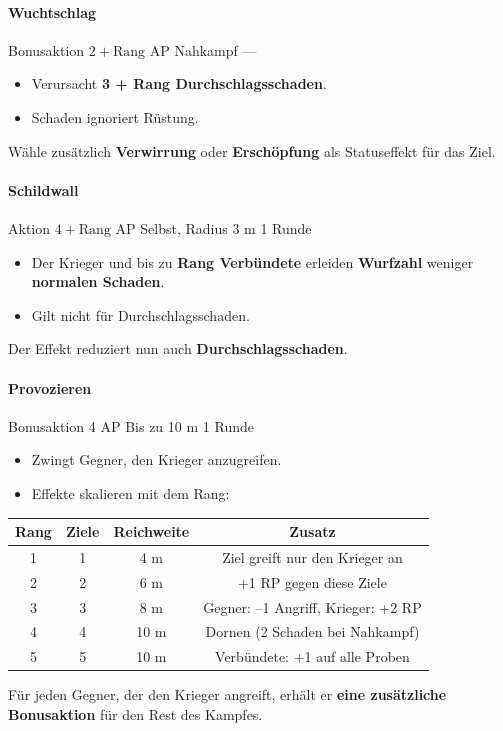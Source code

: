 \paragraph*{Wuchtschlag}

\skillcard
{}
{Bonusaktion}
{$2 + \text{Rang}$ AP}
{Nahkampf}
{—}
{
	\begin{itemize}
		\item Verursacht \textbf{3 + Rang Durchschlagsschaden}.
		\item Schaden ignoriert Rüstung.
	\end{itemize}
}
{
	Wähle zusätzlich \textbf{Verwirrung} oder \textbf{Erschöpfung} als Statuseffekt für das Ziel.
}

\paragraph*{Schildwall}
\skillcard
{}
{Aktion}
{$4 + \text{Rang}$ AP}
{Selbst, Radius 3 m}
{1 Runde}
{
	\begin{itemize}
		\item Der Krieger und bis zu \textbf{Rang Verbündete} erleiden
		\textbf{Wurfzahl} weniger \textbf{normalen Schaden}.
		\item Gilt nicht für Durchschlagsschaden.
	\end{itemize}
}
{
	Der Effekt reduziert nun auch \textbf{Durchschlagsschaden}.
}

\paragraph*{Provozieren}
\skillcard
{}
{Bonusaktion}
{4 AP}
{Bis zu 10 m}
{1 Runde}
{
	\begin{itemize}
		\item Zwingt Gegner, den Krieger anzugreifen.
		\item Effekte skalieren mit dem Rang:
	\end{itemize}
	
	\begin{center}
		\begin{tabular}{cccc}
			\toprule
			\textbf{Rang} & \textbf{Ziele} & \textbf{Reichweite} & \textbf{Zusatz} \\
			\midrule
			1 & 1 & 4 m & Ziel greift nur den Krieger an \\
			2 & 2 & 6 m & +1 RP gegen diese Ziele \\
			3 & 3 & 8 m & Gegner: --1 Angriff, Krieger: +2 RP \\
			4 & 4 & 10 m & Dornen (2 Schaden bei Nahkampf) \\
			5 & 5 & 10 m & Verbündete: +1 auf alle Proben \\
			\bottomrule
		\end{tabular}
	\end{center}
}
{
	Für jeden Gegner, der den Krieger angreift, erhält er
	\textbf{eine zusätzliche Bonusaktion} für den Rest des Kampfes.
}

